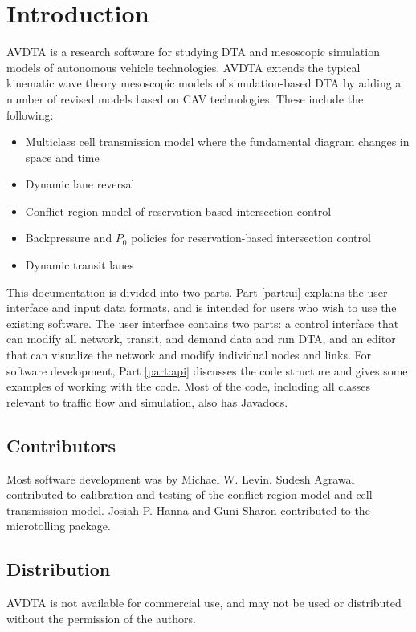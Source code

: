 \chapter{Introduction}

AVDTA is a research software for studying DTA and mesoscopic simulation models of autonomous vehicle technologies.
%
AVDTA extends the typical kinematic wave theory mesoscopic models of simulation-based DTA by adding a number of revised models based on CAV technologies. These include the following:
\begin{itemize}
	\item Multiclass cell transmission model where the fundamental diagram changes in space and time\cite{levin2016multiclass}
	\item Dynamic lane reversal\cite{levin2016cell, duell2016system}
	\item Conflict region model of reservation-based intersection control\cite{levin2015intersection, levin2015optimizing}
	\item Backpressure and $P_0$ policies for reservation-based intersection control
	\item Dynamic transit lanes
\end{itemize}

This documentation is divided into two parts. Part \ref{part:ui} explains the user interface and input data formats, and is intended for users who wish to use the existing software. The user interface contains two parts: a control interface that can modify all network, transit, and demand data and run DTA, and an editor that can visualize the network and modify individual nodes and links. For software development, Part \ref{part:api} discusses the code structure and gives some examples of working with the code. Most of the code, including all classes relevant to traffic flow and simulation, also has Javadocs.

\section{Contributors}
Most software development was by Michael W. Levin. Sudesh Agrawal contributed to calibration and testing of the conflict region model and cell transmission model. Josiah P. Hanna and Guni Sharon contributed to the microtolling package. 

\section{Distribution}
 AVDTA is not available for commercial use, and may not be used or distributed without the permission of the authors.



